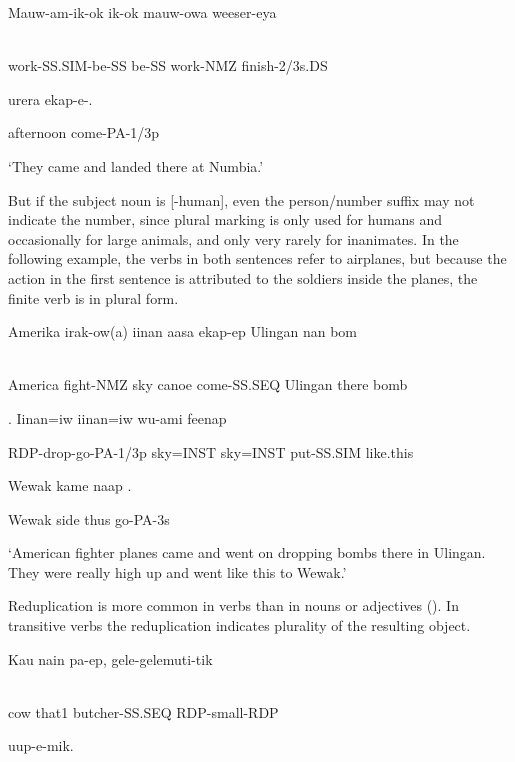 \ea%
\label{ex:x1296}
\gll Mauw-am-ik-ok  ik-ok  mauw-owa  weeser-eya \\
      \\
\glt
\z

work-SS.SIM-be-SS  be-SS  work-NMZ  finish-2/3s.DS  

urera  ekap-e-.

afternoon  come-PA-1/3p

`They came and landed there at Numbia.'

But if the subject noun is [-human], even the person/number suffix may not indicate the number, since plural marking is only used for humans and occasionally for large animals, and only very rarely for inanimates. In the following example, the verbs in both sentences refer to airplanes, but because the action in the first sentence is attributed to the soldiers inside the planes, the finite verb is in plural form. 

\ea%
\label{ex:x1283}
\gll Amerika  irak-ow(a)  iinan  aasa  ekap-ep  Ulingan  nan  bom \\
      \\
\glt
\z

America  fight-NMZ  sky  canoe  come-SS.SEQ  Ulingan  there  bomb

.  Iinan=iw  iinan=iw  wu-ami  feenap

RDP-drop-go-PA-1/3p  sky=INST  sky=INST  put-SS.SIM  like.this

Wewak  kame  naap  .

Wewak  side  thus  go-PA-3s

`American fighter planes came and went on dropping bombs there in Ulingan. They were really high up and went like this to Wewak.'

Reduplication is more common in verbs than in nouns or adjectives (). In transitive verbs the reduplication indicates plurality of the resulting object. 

\ea%
\label{ex:x1298}
\gll Kau  nain  pa-ep,  gele-gelemuti-tik \\
      \\
\glt
\z

cow  that1  butcher-SS.SEQ  RDP-small-RDP

\textstyleEmphasizedVernacularWords{-}  uup-e-mik.

